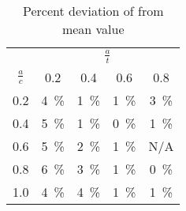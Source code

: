 \begin{table}
\caption{\label{tab:Sij_percentage_grid} Percent deviation of \Sij from mean value}
\centering
\begin{tabular}{SSSSS}
\toprule
&  \\
 & 0.2              & 0.4              & 0.6              & 0.8 \\ \cmidrule(lr){1-1} \cmidrule(lr){2-5}
0.2     & \SI{4}{\percent} & \SI{1}{\percent} & \SI{1}{\percent} & \SI{3}{\percent} \\
0.4     & \SI{5}{\percent} & \SI{1}{\percent} & \SI{0}{\percent} & \SI{1}{\percent} \\
0.6     & \SI{5}{\percent} & \SI{2}{\percent} & \SI{1}{\percent} & {N/A} \\
0.8     & \SI{6}{\percent} & \SI{3}{\percent} & \SI{1}{\percent} & \SI{0}{\percent} \\
1.0     & \SI{4}{\percent} & \SI{4}{\percent} & \SI{1}{\percent} & \SI{1}{\percent} \\ \bottomrule
\end{tabular}
\end{table}

